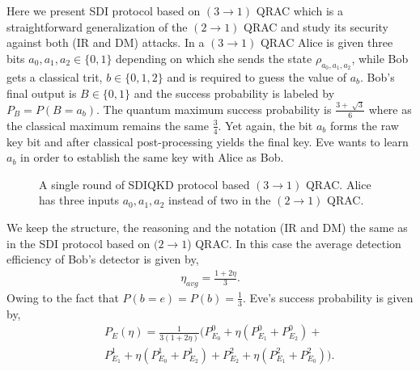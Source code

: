 \documentclass[smallextended]{svjour3}
\newcommand{\be}{\begin{eqnarray}}
\newcommand{\ee}{\end{eqnarray}}
\begin{document}
Here we present SDI protocol based on $(3\to1)$ QRAC which is a straightforward generalization of the $(2\to1)$ QRAC and study its security against both (IR and DM) attacks. In a $(3\to1)$ QRAC Alice is given three bits $a_0,a_1,a_2\in {\{0,1\}}$ depending on which she sends the state $\rho_{a_0,a_1,a_2}$, while Bob gets a classical trit, $b\in \{0,1,2\}$ and is required to guess the value of $a_b$. Bob's final output is  $B\in \{0,1\}$ and the success probability is labeled by
$P_B=P(B=a_b)$. The quantum maximum success probability is $\frac{3+\sqrt[]{3}}{6}$ where as the classical maximum remains the same $\frac{3}{4}$. Yet again, the bit $a_b$ forms the raw key bit and after classical post-processing yields the final key. Eve wants to learn $a_b$ in order to establish the same key with Alice as Bob.
\begin{figure}[htp]
\centering
{}
\caption{A single round of SDIQKD protocol based $(3\to1)$ QRAC. Alice has three inputs $a_0,a_1,a_2$ instead of two in the $(2\to1)$ QRAC. }
\label{26}
\end{figure}
We keep the structure, the reasoning and the notation (IR and DM) the same as in the SDI protocol based on $(2\to 1$) QRAC. In this case the average detection efficiency of Bob's detector is given by,
\be
\eta_{avg}=\frac{1+2\eta}{3}.
\ee
Owing to the fact that $P(b=e)=P(b)=\frac{1}{3}$. Eve's success probability is given by,
\begin{eqnarray}
&& P_E(\eta)= \frac{1}{3(1+2\eta)}\Big(P_{E_0}^0+\eta(P_{E_1}^0+P_{E_2}^0)+ \nonumber \\
&& P_{E_1}^1+\eta( P_{E_0}^1+P_{E_2}^1)+P_{E_2}^2+\eta( P_{E_1}^2+P_{E_0}^2)\Big)\label{max3}.
\end{eqnarray}
\end{document}
